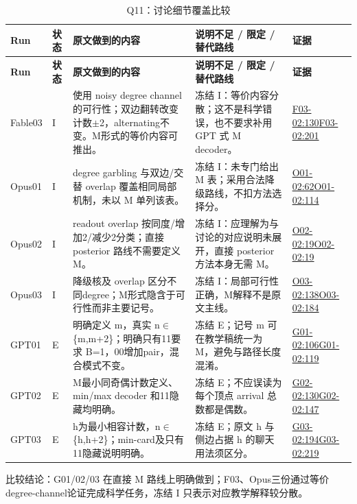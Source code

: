 \documentclass[11pt,a4paper]{article}
\begin{document}
{\fontsize{9.0}{12.6}\selectfont
\setlength{\tabcolsep}{2.5pt}
\begin{longtable}{>{\raggedright\arraybackslash}p{}>{\raggedright\arraybackslash}p{}>{\raggedright\arraybackslash}p{}>{\raggedright\arraybackslash}p{}>{\raggedright\arraybackslash}p{}}
\caption{Q11：讨论细节覆盖比较}\\
\toprule
\textbf{Run} & \textbf{状态} & \textbf{原文做到的内容} & \textbf{说明不足 / 限定 / 替代路线} & \textbf{证据}\tabularnewline
\midrule
\endfirsthead
\toprule
\textbf{Run} & \textbf{状态} & \textbf{原文做到的内容} & \textbf{说明不足 / 限定 / 替代路线} & \textbf{证据}\tabularnewline
\midrule
\endhead
{}Fable03 & I & 使用 noisy degree channel 的可行性；双边翻转改变计数\ensuremath{\pm}2，alternating不变。M形式的等价内容可推出。 & 冻结 I：等价内容分散；这不是科学错误，也不要求补用 GPT 式 M decoder。 & \hyperref[src:F03-02]{F03-02:130}\newline \hyperref[src:F03-02]{F03-02:201}\tabularnewline
{}Opus01 & I & degree garbling 与双边/交替 overlap 覆盖相同局部机制，未以 M 单列该表。 & 冻结 I：未专门给出 M 表；采用合法降级路线，不扣方法选择分。 & \hyperref[src:O01-02]{O01-02:62}\newline \hyperref[src:O01-02]{O01-02:114}\tabularnewline
{}Opus02 & I & readout overlap 按同度/增加2/减少2分类；直接 posterior 路线不需要定义 M。 & 冻结 I：应理解为与讨论的对应说明未展开，直接 posterior 方法本身无需 M。 & \hyperref[src:O02-02]{O02-02:19}\newline \hyperref[src:O02-02]{O02-02:19}\tabularnewline
{}Opus03 & I & 降级核及 overlap 区分不同degree；M形式隐含于可行性而非主要记号。 & 冻结 I：局部可行性正确，M解释不是原文主线。 & \hyperref[src:O03-02]{O03-02:138}\newline \hyperref[src:O03-02]{O03-02:184}\tabularnewline
{}GPT01 & E & 明确定义 m，真实 n\ensuremath{\in}\{m,m+2\}；明确只有11要求 B=1，00增加pair，混合模式不变。 & 冻结 E；记号 m 可在教学稿统一为 M，避免与路径长度混淆。 & \hyperref[src:G01-02]{G01-02:106}\newline \hyperref[src:G01-02]{G01-02:119}\tabularnewline
{}GPT02 & E & M最小同奇偶计数定义、min/max decoder 和11隐藏均明确。 & 冻结 E；不应误读为每个顶点 arrival 总数都是偶数。 & \hyperref[src:G02-02]{G02-02:130}\newline \hyperref[src:G02-02]{G02-02:147}\tabularnewline
{}GPT03 & E & h为最小相容计数，n\ensuremath{\in}\{h,h+2\}；min-card及只有11隐藏说明明确。 & 冻结 E；原文 h 与侧边占据 h 的聊天用法须区分。 & \hyperref[src:G03-02]{G03-02:194}\newline \hyperref[src:G03-02]{G03-02:219}\tabularnewline
\bottomrule
\end{longtable}
}
比较结论：G01/02/03 在直接 M 路线上明确做到；F03、Opus三份通过等价degree-channel论证完成科学任务，冻结 I 只表示对应教学解释较分散。
\end{document}

